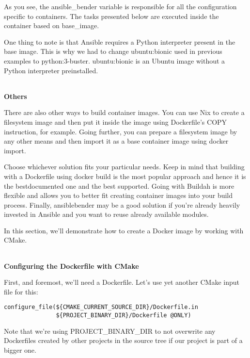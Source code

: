 As you see, the ansible\_bender variable is responsible for all the configuration specific to containers. The tasks presented below are executed inside the container based on base\_image.

One thing to note is that Ansible requires a Python interpreter present in the base image. This is why we had to change ubuntu:bionic used in previous examples to python:3-buster. ubuntu:bionic is an Ubuntu image without a Python interpreter preinstalled.

\hspace*{\fill} \\ %
\noindent
\textbf{Others}

There are also other ways to build container images. You can use Nix to create a filesystem image and then put it inside the image using Dockerfile's COPY instruction, for example. Going further, you can prepare a filesystem image by any other means and then import it as a base container image using docker import.

Choose whichever solution fits your particular needs. Keep in mind that building with a Dockerfile using docker build is the most popular approach and hence it is the bestdocumented one and the best supported. Going with Buildah is more flexible and allows you to better fit creating container images into your build process. Finally, ansiblebender may be a good solution if you're already heavily invested in Ansible and you want to reuse already available modules.


In this section, we'll demonstrate how to create a Docker image by working with CMake.

\hspace*{\fill} \\ %
\noindent
\textbf{Configuring the Dockerfile with CMake}

First, and foremost, we'll need a Dockerfile. Let's use yet another CMake input file for this:

\begin{lstlisting}[style=styleCMake]
configure_file(${CMAKE_CURRENT_SOURCE_DIR}/Dockerfile.in
			   ${PROJECT_BINARY_DIR}/Dockerfile @ONLY)
\end{lstlisting}

Note that we're using PROJECT\_BINARY\_DIR to not overwrite any Dockerfiles created by other projects in the source tree if our project is part of a bigger one.

